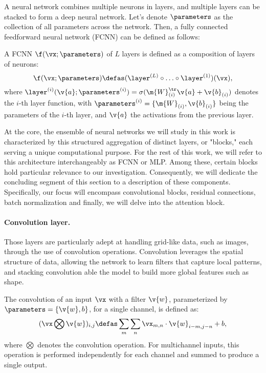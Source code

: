 A neural network combines multiple neurons in layers, and multiple layers can be stacked to form a deep neural network. Let's denote $\parameters$ as the collection of all parameters across the network. Then, a fully connected feedforward neural network (FCNN) can be defined as follows:

\begin{definition}
A FCNN $\f(\vx; \parameters)$ of $L$ layers is defined as a composition of layers of neurons:
\[
\f(\vx; \parameters) \defas (\layer^{(L)} \circ \ldots \circ \layer^{(1)})(\vx),
\]
where $\layer^{(i)}(\v{a}; \parameters^{(i)}) = \sigma(\m{W}_{(i)}^\tr \v{a} + \v{b}_{(i)})$ denotes the $i$-th layer function, with $\parameters^{(i)} = \{\m{W}_{(i)}, \v{b}_{(i)}\}$ being the parameters of the $i$-th layer, and $\v{a}$ the activations from the previous layer.
\end{definition}

At the core, the ensemble of neural networks we will study in this work is characterized by this structured aggregation of distinct layers, or "blocks," each serving a unique computational purpose. For the rest of this work, we will refer to this architecture interchangeably as FCNN or MLP.
Among these, certain blocks hold particular relevance to our investigation. Consequently, we will dedicate the concluding segment of this section to a description of these components. Specifically, our focus will encompass convolutional blocks, residual connections, batch normalization and finally, we will delve into the attention block.

\paragraph{Convolution layer.} Those layers are particularly adept at handling grid-like data, such as images, through the use of convolution operations. Convolution leverages the spatial structure of data, allowing the network to learn filters that capture local patterns, and stacking convolution able the model to build more global features such as shape.

\begin{definition}
The convolution of an input $\vx$ with a filter $\v{w}$, parameterized by $\parameters = \{\v{w}, b\}$, for a single channel, is defined as:
\[
(\vx \bigotimes \v{w})_{i,j} \defas \sum_{m}\sum_{n} \vx_{m,n} \cdot \v{w}_{i-m, j-n} + b,
\]
where $\bigotimes$ denotes the convolution operation. For multichannel inputs, this operation is performed independently for each channel and summed to produce a single output.
\end{definition}

